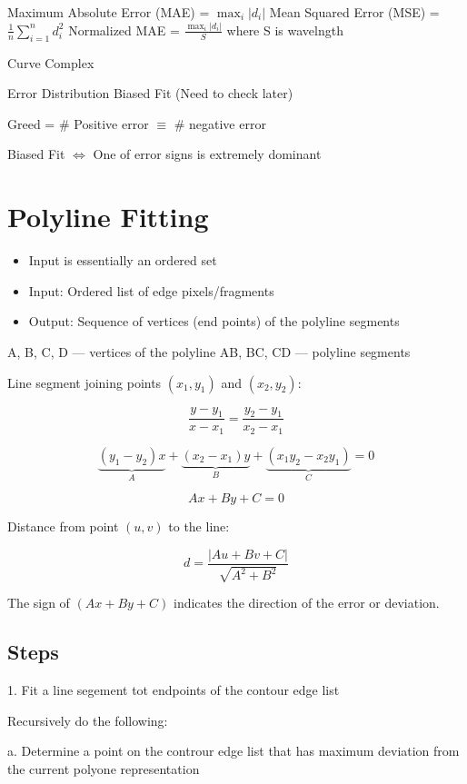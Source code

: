 \documentclass[11pt]{article}
\theoremstyle{definition}
\begin{document}
Maximum Absolute Error (MAE) = $\max_i|d_i|$
Mean Squared Error (MSE) = $\frac{1}{n}\sum_{i=1}^{n}d_i^2$
Normalized MAE = $\frac{\max_i\left|d_i\right|}{S}$ where S is wavelngth

Curve Complex

Error Distribution Biased Fit (Need to check later)

Greed = \# Positive error $\equiv$ \# negative error

Biased Fit $\iff$ One of error signs is extremely dominant

\newpage
\pagestyle{plain}  %

\section*{Polyline Fitting}
\begin{itemize}
    \item Input is essentially an ordered set
    \item Input: Ordered list of edge pixels/fragments
    \item Output: Sequence of vertices (end points) of the polyline segments
\end{itemize}

A, B, C, D --- vertices of the polyline  
AB, BC, CD --- polyline segments

Line segment joining points $(x_1, y_1)$ and $(x_2, y_2)$:

\[
\frac{y - y_1}{x - x_1} = \frac{y_2 - y_1}{x_2 - x_1}
\]

\[
\underbrace{(y_1 - y_2)x}_{A} + \underbrace{(x_2 - x_1)y}_{B} + \underbrace{(x_1y_2 - x_2y_1)}_{C} = 0
\]

\[
Ax + By + C = 0
\]

Distance from point $(u, v)$ to the line:

\[
d = \frac{|Au + Bv + C|}{\sqrt{A^2 + B^2}}
\]

The sign of $\left(Ax + By + C\right)$ indicates the direction of the error or deviation.


\subsection{Steps}
1. Fit a line segement tot endpoints of the contour edge list 

Recursively do the following:

a. Determine a point on the controur edge list that has maximum deviation from the current polyone representation 
\end{document}
